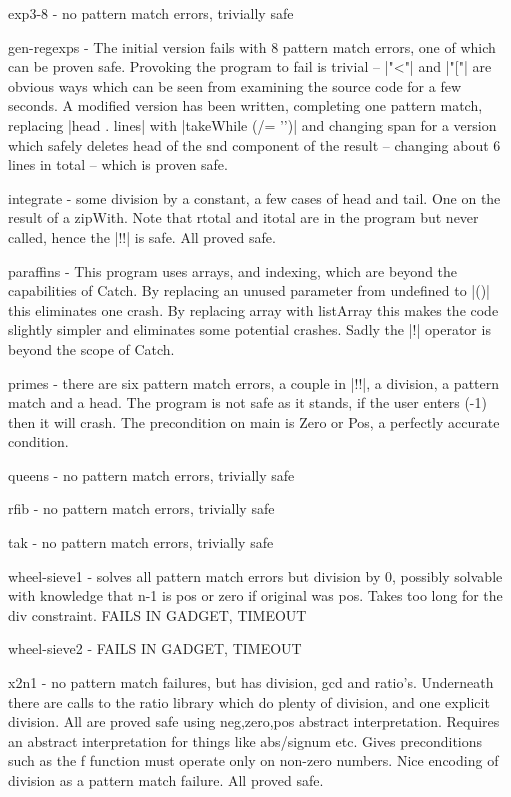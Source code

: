 \documentclass[preprint]{sigplanconf}
\newcommand{\C}[1]{\textsf{#1}}
\begin{document}
exp3-8 - no pattern match errors, trivially safe

gen-regexps - The initial version fails with 8 pattern match errors, one of which can be proven safe. Provoking the program to fail is trivial -- |"<"| and |"["| are obvious ways which can be seen from examining the source code for a few seconds. A modified version has been written, completing one pattern match, replacing |head . lines| with |takeWhile (/= '\n')| and changing \C{span} for a version which safely deletes head of the \C{snd} component of the result -- changing about 6 lines in total -- which is proven safe.

integrate - some division by a constant, a few cases of head and tail. One on the result of a zipWith. Note that \C{rtotal} and \C{itotal} are in the program but never called, hence the |!!| is safe. All proved safe.

paraffins - This program uses arrays, and indexing, which are beyond the capabilities of Catch. By replacing an unused parameter from \C{undefined} to |()| this eliminates one crash. By replacing \C{array} with \C{listArray} this makes the code slightly simpler and eliminates some potential crashes. Sadly the |!| operator is beyond the scope of Catch.

primes - there are six pattern match errors, a couple in |!!|, a division, a pattern match and a head. The program is not safe as it stands, if the user enters (-1) then it will crash. The precondition on \C{main} is Zero or Pos, a perfectly accurate condition.

queens - no pattern match errors, trivially safe

rfib - no pattern match errors, trivially safe

tak - no pattern match errors, trivially safe

wheel-sieve1 - solves all pattern match errors but division by 0, possibly solvable with knowledge that n-1 is pos or zero if original was pos. Takes too long for the div constraint. FAILS IN GADGET, TIMEOUT

wheel-sieve2 - FAILS IN GADGET, TIMEOUT

x2n1 - no pattern match failures, but has division, gcd and ratio's. Underneath there are calls to the ratio library which do plenty of division, and one explicit division. All are proved safe using neg,zero,pos abstract interpretation. Requires an abstract interpretation for things like abs/signum etc. Gives preconditions such as the f function must operate only on non-zero numbers. Nice encoding of division as a pattern match failure. All proved safe.
\end{document}
